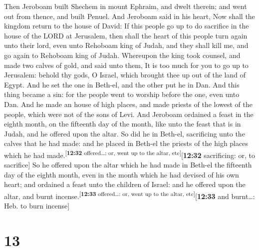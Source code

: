  Then Jeroboam built Shechem in mount Ephraim, and dwelt
therein; and went out from thence, and built Penuel.  And
Jeroboam said in his heart, Now shall the kingdom return to the house of
David:  If this people go up to do sacrifice in the house
of the LORD at Jerusalem, then shall the heart of this people turn again
unto their lord, even unto Rehoboam king of Judah, and they shall kill
me, and go again to Rehoboam king of Judah.  Whereupon
the king took counsel, and made two calves of gold, and said unto them,
It is too much for you to go up to Jerusalem: behold thy gods, O Israel,
which brought thee up out of the land of Egypt.  And he
set the one in Beth-el, and the other put he in Dan.  And
this thing became a sin: for the people went to worship before the one,
even unto Dan.  And he made an house of high places, and
made priests of the lowest of the people, which were not of the sons of
Levi.  And Jeroboam ordained a feast in the eighth month,
on the fifteenth day of the month, like unto the feast that is in Judah,
and he offered upon the altar. So did he in Beth-el, sacrificing unto
the calves that he had made: and he placed in Beth-el the priests of the
high places which he had made.\textsuperscript{{[}\textbf{12:32}
offered\ldots: or, went up to the altar, etc{]}}{[}\textbf{12:32}
sacrificing: or, to sacrifice{]}  So he offered upon the
altar which he had made in Beth-el the fifteenth day of the eighth
month, even in the month which he had devised of his own heart; and
ordained a feast unto the children of Israel: and he offered upon the
altar, and burnt incense.\textsuperscript{{[}\textbf{12:33}
offered\ldots: or, went up to the altar, etc{]}}{[}\textbf{12:33} and
burnt\ldots: Heb. to burn incense{]}

\hypertarget{section-12}{%
\section{13}\label{section-12}}

